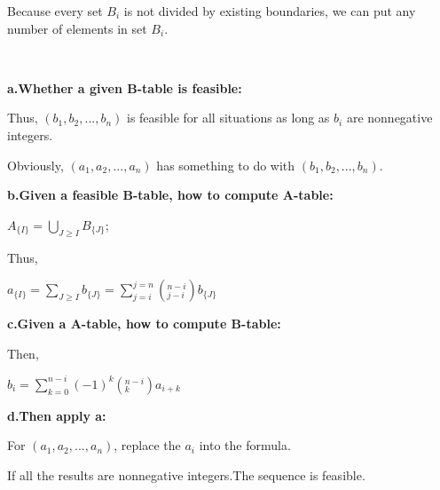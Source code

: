 \documentclass[12pt,a4]{article}
\theoremstyle{exercise}
\begin{document}
     Because every set $B_i$ is not divided by existing boundaries, we can put any number of elements in set $B_i$.
     
     \ 

     \textbf{a.Whether a given B-table is feasible:}

     
     Thus, $(b_1,b_2,...,b_n)$ is feasible for all situations as long as $b_i$ are nonnegative integers.

     Obviously, $(a_1,a_2,...,a_n)$ has something to do with $(b_1,b_2,...,b_n)$.
     
     \textbf{b.Given a feasible B-table, how to compute A-table:}

	 \begin{center}
     $A_{\{I\}}=\bigcup \limits_{J\ge I}B_{\{J\}}$;
     \end{center}

     Thus, 
     \begin{center}
     $a_{\{I\}}=\sum \limits_{J\ge I}b_{\{J\}}=\sum \limits_{j=i}^{j=n} (_{j-i}^{n-i}) b_{\{J\}}$
	 \end{center}
     

     \textbf{c.Given a A-table, how to compute B-table:}

     Then,

     \begin{center}
     $b_i=\sum \limits_{k=0}^{n-i} (-1)^k (_{k}^{n-i} )a_{i+k}$
     \end{center}

     \textbf{d.Then apply a:}
     
     For $(a_1,a_2,...,a_n)$, replace the $a_i$ into the formula.
     
     If all the results are nonnegative integers.The sequence is feasible.
     
\end{document}
